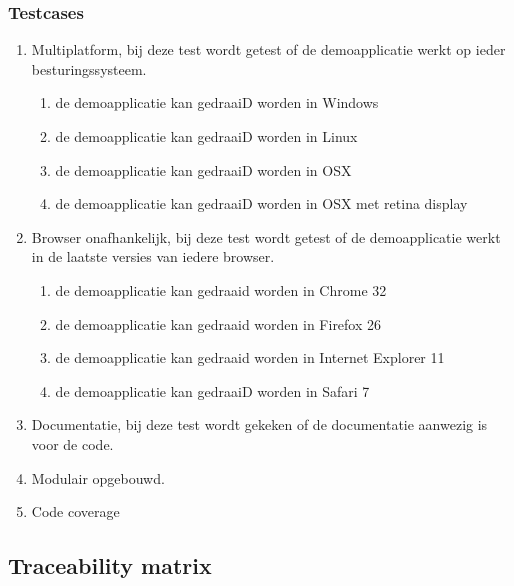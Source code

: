 \subsubsection{Testcases}
\begin{enumerate}[label={T\arabic*}]
	\setcounter{enumi}{\value{startvaluetest}}
	\item Multiplatform, bij deze test wordt getest of de demoapplicatie werkt op ieder besturingssysteem.
    \begin{enumerate}[label={T\arabic{enumi}.\arabic*}]
    	\item de demoapplicatie kan gedraaiD worden in Windows
    	\item de demoapplicatie kan gedraaiD worden in Linux
    	\item de demoapplicatie kan gedraaiD worden in OSX
    	\item de demoapplicatie kan gedraaiD worden in OSX met retina display
    \end{enumerate}
	\item Browser onafhankelijk, bij deze test wordt getest of de demoapplicatie werkt in de laatste versies van iedere browser.
    \begin{enumerate}[label={T\arabic{enumi}.\arabic*}]
    	\item de demoapplicatie kan gedraaid worden in Chrome 32
    	\item de demoapplicatie kan gedraaid worden in Firefox 26
    	\item de demoapplicatie kan gedraaid worden in Internet Explorer 11 
    	\item de demoapplicatie kan gedraaiD worden in Safari 7 
    \end{enumerate}
	\item Documentatie, bij deze test wordt gekeken of de documentatie aanwezig is voor de code. 
	\item Modulair opgebouwd. 
	\item Code coverage 
\end{enumerate}


\subsection{Traceability matrix} \label{sec:traceability}

